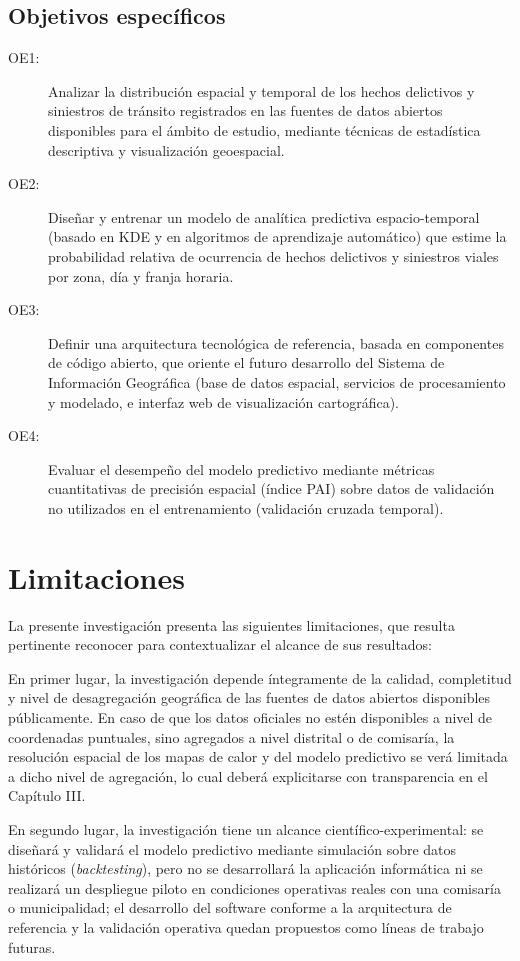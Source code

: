 \documentclass[12pt,letterpaper]{report}
\begin{document}
\subsection{Objetivos espec\'ificos}
\begin{description}
    \item[OE1:] Analizar la distribuci\'on espacial y temporal de los hechos delictivos y siniestros de tr\'ansito registrados en las fuentes de datos abiertos disponibles para el \'ambito de estudio, mediante t\'ecnicas de estad\'istica descriptiva y visualizaci\'on geoespacial.
    \item[OE2:] Dise\~nar y entrenar un modelo de analítica predictiva espacio-temporal (basado en KDE y en algoritmos de aprendizaje autom\'atico) que estime la probabilidad relativa de ocurrencia de hechos delictivos y siniestros viales por zona, d\'ia y franja horaria.
    \item[OE3:] Definir una arquitectura tecnol\'ogica de referencia, basada en componentes de c\'odigo abierto, que oriente el futuro desarrollo del Sistema de Informaci\'on Geogr\'afica (base de datos espacial, servicios de procesamiento y modelado, e interfaz web de visualizaci\'on cartogr\'afica).
    \item[OE4:] Evaluar el desempe\~no del modelo predictivo mediante m\'etricas cuantitativas de precisi\'on espacial (\'indice PAI) sobre datos de validaci\'on no utilizados en el entrenamiento (validaci\'on cruzada temporal).
\end{description}

\section{Limitaciones}

La presente investigaci\'on presenta las siguientes limitaciones, que resulta pertinente reconocer para contextualizar el alcance de sus resultados:

En primer lugar, la investigaci\'on depende \'integramente de la calidad, completitud y nivel de desagregaci\'on geogr\'afica de las fuentes de datos abiertos disponibles p\'ublicamente. En caso de que los datos oficiales no est\'en disponibles a nivel de coordenadas puntuales, sino agregados a nivel distrital o de comisar\'ia, la resoluci\'on espacial de los mapas de calor y del modelo predictivo se ver\'a limitada a dicho nivel de agregaci\'on, lo cual deber\'a explicitarse con transparencia en el Cap\'itulo III.

En segundo lugar, la investigaci\'on tiene un alcance cient\'ifico-experimental: se dise\~nar\'a y validar\'a el modelo predictivo mediante simulaci\'on sobre datos hist\'oricos (\textit{backtesting}), pero no se desarrollar\'a la aplicaci\'on inform\'atica ni se realizar\'a un despliegue piloto en condiciones operativas reales con una comisar\'ia o municipalidad; el desarrollo del software conforme a la arquitectura de referencia y la validaci\'on operativa quedan propuestos como l\'ineas de trabajo futuras.
\end{document}

